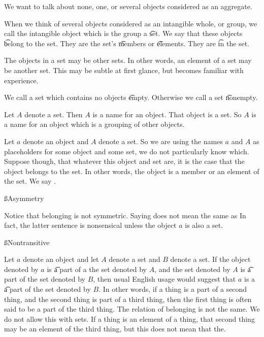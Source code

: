 

We want to talk about none, one, or several objects considered as an aggregate.


When we think of several objects considered as an intangible whole, or group, we call the intangible object which is the group a \t{set}.
We say that these objects \t{belong} to the set.
They are the set's \t{members} or \t{elements}.
They are \t{in} the set.

The objects in a set may be other sets.
In other words, an element of a set may be another set.
This may be subtle at first glance, but becomes familiar with experience.

We call a set which contains no objects \t{empty}.
Otherwise we call a set \t{nonempty}.


Let $A$ denote a set.
Then $A$ is a name for an object.
That object is a set.
So $A$ is a name for an object which is a grouping of other objects.


Let $a$ denote an object and $A$ denote a set.
So we are using the names $a$ and $A$ as placeholders for some object and some set, we do not particularly know which.
Suppose though, that whatever this object and set are, it is the case that the object belongs to the set.
In other words, the object is a member or an element of the set.
We say .

\ss{Asymmetry}

Notice that belonging is not symmetric.
Saying  does not mean the same as 
In fact, the latter sentence is nonsensical unless the object $a$ is also a set.

\ss{Nontransitive}

Let $a$ denote an object and let $A$ denote a set and $B$ denote a set.
If the object denoted by $a$ is \t{a part of} a the set denoted by $A$, and the set denoted by $A$ is \t{a part of} the set denoted by $B$, then usual English usage would suggest that $a$ is a \t{a part of} the set denoted by $B$.
In other words, if a thing is a part of a second thing, and the second thing is part of a third thing, then the first thing is often said to be a part of the third thing.
The relation of belonging is not the same.
We do not allow this with sets.
If a thing is an element of a thing, that second thing may be an element of the third thing, but this does not mean that the.

